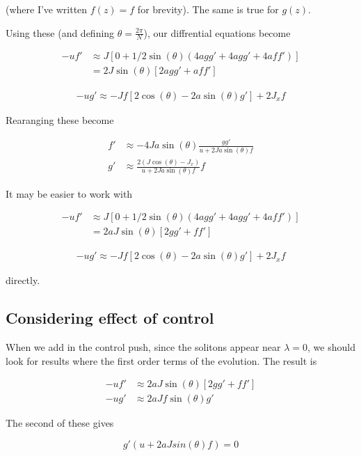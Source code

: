\documentclass{article}
\begin{document}
(where I've written $f(z) = f$ for brevity). The same is true for $g(z)$.

Using these (and defining $\theta = \frac{2\pi}{N}$), our diffrential equations become

\begin{align*}
    -uf' &\approx J[0 +1/2\sin(\theta)(4agg' + 4agg' + 4aff')] \\
            &= 2J\sin(\theta)[2agg' + aff']
\end{align*}

\begin{align*}
    -ug' \approx -Jf[2\cos(\theta) - 2a\sin(\theta)g'] + 2J_xf
\end{align*}

Rearanging these become

\begin{align*}
    f' &\approx -4Ja\sin(\theta)\frac{gg'}{u + 2Ja\sin(\theta)f} \\
    g' &\approx \frac{2(J\cos(\theta) - J_x)}{u + 2Ja\sin(\theta)f}f
\end{align*}

It may be easier to work with 

\begin{align*}
    -uf' &\approx J[0 +1/2\sin(\theta)(4agg' + 4agg' + 4aff')] \\
            &= 2aJ\sin(\theta)[2gg' + ff']
\end{align*}

\begin{align*}
    -ug' \approx -Jf[2\cos(\theta) - 2a\sin(\theta)g'] + 2J_xf
\end{align*}

directly.

\subsection{Considering effect of control}

When we add in the control push, since the solitons appear near $\lambda = 0$, we should look for results where the first order terms of the evolution.
The result is 

\begin{align*}
    -uf' &\approx 2aJ\sin(\theta)[2gg' + ff'] \\
     -ug'&\approx 2aJf\sin(\theta)g'
\end{align*}

The second of these gives

\[
g'(u+2aJsin(\theta)f) = 0
\]
\end{document}
